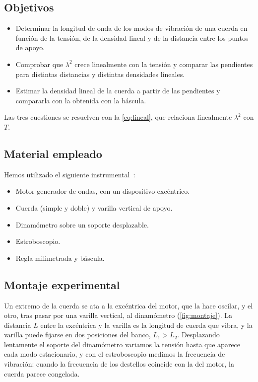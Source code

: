 \documentclass[a4paper,11pt]{amsart}
\numberwithin{equation}{section}
\theoremstyle{cienplano}
\theoremstyle{ciendef}
\theoremstyle{cienobs}
\begin{document}
\subsection{Objetivos}\label{sec:objetivos}
\begin{itemize}
  \item Determinar la longitud de onda de los modos de vibración de una cuerda
        en función de la tensión, de la densidad lineal y de la distancia
        entre los puntos de apoyo.
  \item Comprobar que $\lambda^{2}$ crece linealmente con la tensión y
        comparar las pendientes para distintas distancias y distintas
        densidades lineales.
  \item Estimar la densidad lineal de la cuerda a partir de las pendientes y
        compararla con la obtenida con la báscula.
\end{itemize}
Las tres cuestiones se resuelven con la \cref{eq:lineal}, que relaciona
linealmente $\lambda^{2}$ con $T$.

\subsection{Material empleado}\label{sec:material}
Hemos utilizado el siguiente instrumental~\cite{GUION-P2}:
\begin{itemize}
  \item Motor generador de ondas, con un dispositivo excéntrico.
  \item Cuerda (simple y doble) y varilla vertical de apoyo.
  \item Dinamómetro sobre un soporte desplazable.
  \item Estroboscopio.
  \item Regla milimetrada y báscula.
\end{itemize}

\subsection{Montaje experimental}\label{sec:montaje}
Un extremo de la cuerda se ata a la excéntrica del motor, que la hace
oscilar, y el otro, tras pasar por una varilla vertical, al dinamómetro
(\cref{fig:montaje}). La distancia $L$ entre la excéntrica y la varilla es la
longitud de cuerda que vibra, y la varilla puede fijarse en dos posiciones
del banco, $L_1>L_2$. Desplazando lentamente el soporte del dinamómetro
variamos la tensión hasta que aparece cada modo estacionario, y con el
estroboscopio medimos la frecuencia de vibración: cuando la frecuencia de los
destellos coincide con la del motor, la cuerda parece congelada.
\end{document}
